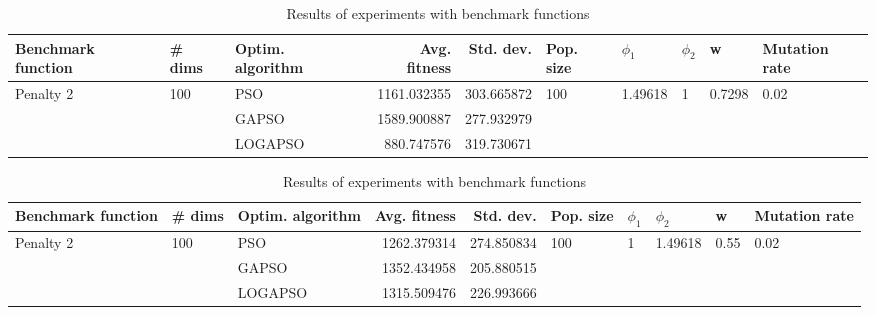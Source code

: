 \documentclass{article}
\begin{document}
\begin{table}
\centering
\caption{Results of experiments with benchmark functions}
\begin{tabular}{lllrrlllll}
\toprule
        Benchmark function &              \# dims & Optim. algorithm &  Avg. fitness &  Std. dev. &            Pop. size &               $\phi_{1}$ &         $\phi_{2}$ &                       w &         Mutation rate \\
\midrule
\multirow{3}{*}{Penalty 2} & \multirow{3}{*}{100} &              PSO &   1161.032355 & 303.665872 & \multirow{3}{*}{100} & \multirow{3}{*}{1.49618} & \multirow{3}{*}{1} & \multirow{3}{*}{0.7298} & \multirow{3}{*}{0.02} \\
                           &                      &            GAPSO &   1589.900887 & 277.932979 &                      &                          &                    &                         &                       \\
                           &                      &          LOGAPSO &    880.747576 & 319.730671 &                      &                          &                    &                         &                       \\
\bottomrule
\end{tabular}
\end{table}
\begin{table}
\centering
\caption{Results of experiments with benchmark functions}
\begin{tabular}{lllrrlllll}
\toprule
        Benchmark function &              \# dims & Optim. algorithm &  Avg. fitness &  Std. dev. &            Pop. size &         $\phi_{1}$ &               $\phi_{2}$ &                     w &         Mutation rate \\
\midrule
\multirow{3}{*}{Penalty 2} & \multirow{3}{*}{100} &              PSO &   1262.379314 & 274.850834 & \multirow{3}{*}{100} & \multirow{3}{*}{1} & \multirow{3}{*}{1.49618} & \multirow{3}{*}{0.55} & \multirow{3}{*}{0.02} \\
                           &                      &            GAPSO &   1352.434958 & 205.880515 &                      &                    &                          &                       &                       \\
                           &                      &          LOGAPSO &   1315.509476 & 226.993666 &                      &                    &                          &                       &                       \\
\bottomrule
\end{tabular}
\end{table}
\end{document}
